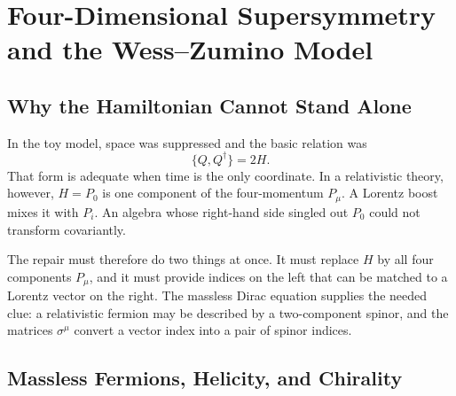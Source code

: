 \chapter{Four-Dimensional Supersymmetry and the Wess--Zumino Model}


\section{Why the Hamiltonian Cannot Stand Alone}

In the toy model, space was suppressed and the basic relation was
\begin{equation}
\{Q,Q^\dagger\}=2H.
\label{eq:l8-time-only-algebra}
\end{equation}
That form is adequate when time is the only coordinate. In a relativistic theory, however, \(H=P_0\) is one component of the four-momentum \(P_\mu\). A Lorentz boost mixes it with \(P_i\). An algebra whose right-hand side singled out \(P_0\) could not transform covariantly.

The repair must therefore do two things at once. It must replace \(H\) by all four components \(P_\mu\), and it must provide indices on the left that can be matched to a Lorentz vector on the right. The massless Dirac equation supplies the needed clue: a relativistic fermion may be described by a two-component spinor, and the matrices \(\sigma^\mu\) convert a vector index into a pair of spinor indices.

\section{Massless Fermions, Helicity, and Chirality}

